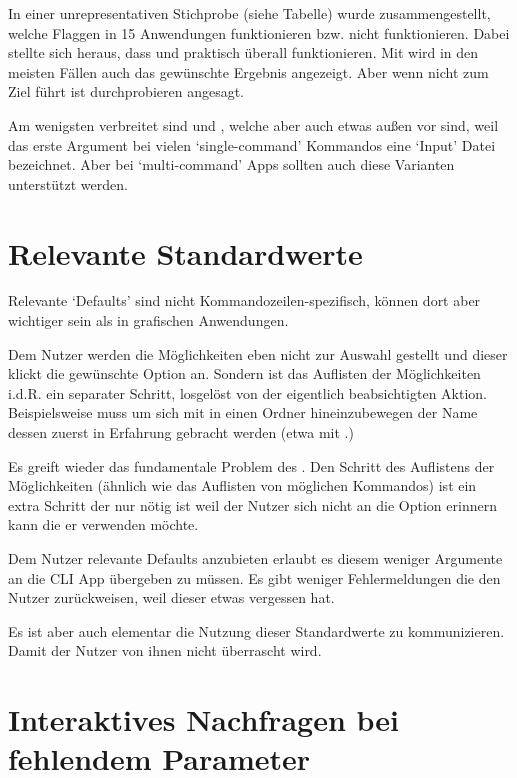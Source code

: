 \documentclass[oneside,bibliography=totocnumbered,BCOR=5mm]{scrbook}
\begin{document}
In einer unrepresentativen Stichprobe (siehe Tabelle) wurde zusammengestellt,
welche Flaggen in 15 Anwendungen funktionieren bzw. nicht funktionieren. Dabei
stellte sich heraus, dass  und  praktisch
überall funktionieren. Mit  wird in den meisten Fällen
auch das gewünschte Ergebnis angezeigt. Aber wenn  nicht
zum Ziel führt ist durchprobieren angesagt.

Am wenigsten verbreitet sind  und ,
welche aber auch etwas außen vor sind, weil das erste Argument bei vielen
`single-command' Kommandos eine `Input' Datei bezeichnet. Aber bei
`multi-command' Apps sollten auch diese Varianten unterstützt werden.

\section{Relevante Standardwerte}

Relevante `Defaults' sind nicht Kommandozeilen-spezifisch, können dort aber
wichtiger sein als in grafischen Anwendungen.

Dem Nutzer werden die Möglichkeiten eben nicht zur Auswahl gestellt und dieser
klickt die gewünschte Option an. Sondern ist das Auflisten der Möglichkeiten
i.d.R. ein separater Schritt, losgelöst von der eigentlich beabsichtigten
Aktion. Beispielsweise muss um sich mit  in einen Ordner
hineinzubewegen der Name dessen zuerst in Erfahrung gebracht werden (etwa mit
.)

Es greift wieder das fundamentale Problem des . Den Schritt des
Auflistens der Möglichkeiten (ähnlich wie das Auflisten von möglichen Kommandos)
ist ein extra Schritt der nur nötig ist weil der Nutzer sich nicht an die Option
erinnern kann die er verwenden möchte.

\bigskip


Dem Nutzer relevante Defaults anzubieten erlaubt es diesem weniger Argumente an
die CLI App übergeben zu müssen. Es gibt weniger Fehlermeldungen die den Nutzer
zurückweisen, weil dieser etwas vergessen hat.

Es ist aber auch elementar die Nutzung dieser Standardwerte zu kommunizieren.
Damit der Nutzer von ihnen nicht überrascht wird.

\section{Interaktives Nachfragen bei fehlendem Parameter}
\end{document}
